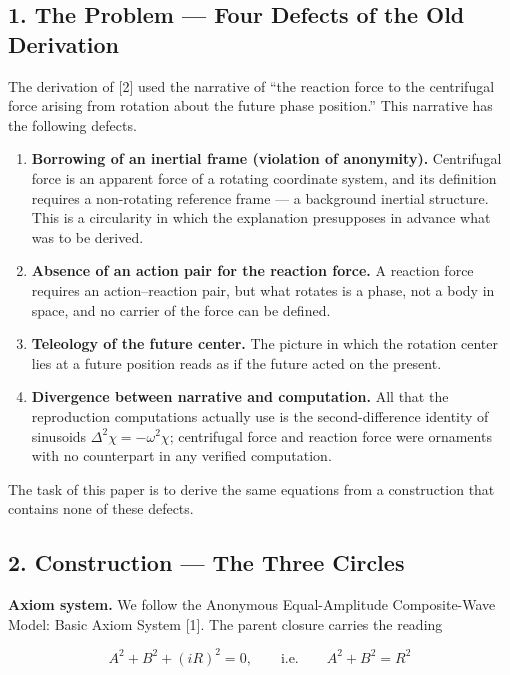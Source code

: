 \documentclass[
  a4paper,
]{article}
\providecommand{\tightlist}{%
  \setlength{\itemsep}{0pt}\setlength{\parskip}{0pt}}
\begin{document}
\subsection{1. The Problem --- Four Defects of the Old
Derivation}\label{the-problem-four-defects-of-the-old-derivation}

The derivation of {[}2{]} used the narrative of ``the reaction force to
the centrifugal force arising from rotation about the future phase
position.'' This narrative has the following defects.

\begin{enumerate}
\def\labelenumi{\arabic{enumi}.}
\tightlist
\item
  \textbf{Borrowing of an inertial frame (violation of anonymity).}
  Centrifugal force is an apparent force of a rotating coordinate
  system, and its definition requires a non-rotating reference frame ---
  a background inertial structure. This is a circularity in which the
  explanation presupposes in advance what was to be derived.
\item
  \textbf{Absence of an action pair for the reaction force.} A reaction
  force requires an action--reaction pair, but what rotates is a phase,
  not a body in space, and no carrier of the force can be defined.
\item
  \textbf{Teleology of the future center.} The picture in which the
  rotation center lies at a future position reads as if the future acted
  on the present.
\item
  \textbf{Divergence between narrative and computation.} All that the
  reproduction computations actually use is the second-difference
  identity of sinusoids \(\Delta^2\chi=-\omega^2\chi\); centrifugal
  force and reaction force were ornaments with no counterpart in any
  verified computation.
\end{enumerate}

The task of this paper is to derive the same equations from a
construction that contains none of these defects.

\subsection{2. Construction --- The Three
Circles}\label{construction-the-three-circles}

\textbf{Axiom system.} We follow the Anonymous Equal-Amplitude
Composite-Wave Model: Basic Axiom System {[}1{]}. The parent closure
carries the reading

\[
A^2+B^2+(iR)^2=0,\qquad\text{i.e.}\qquad A^2+B^2=R^2
\]
\end{document}
